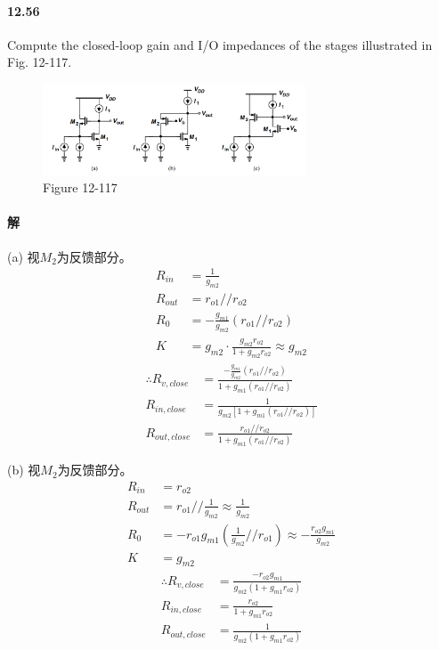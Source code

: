 \documentclass[hyperref, UTF8]{ctexart}
\newcommand{\under}[1]{\frac{1}{#1}}
\begin{document}
\paragraph{12.56} \label{12.56}
    Compute the closed-loop gain and I/O impedances of the stages illustrated in Fig. 12-117.
    \begin{figure}[!htb]
        \centering
        \includegraphics[width=0.695\textwidth]{p12-117.png}
        \caption*{Figure 12-117}
    \end{figure}        
\paragraph{解}
    (a) 视$M_2$为反馈部分。
    \begin{align*}
        R_{in} & = \under{g_{m2}} \\
        R_{out} & = r_{o1} // r_{o2} \\
        R_0 & = -\frac{g_{m1}}{g_{m2}}(r_{o1}//r_{o2})\\
        K & = g_{m2} \cdot \frac{g_{m2}r_{o2}}{1+g_{m2}r_{o2}} \approx g_{m2}
    \end{align*}
    \begin{align*}
        \therefore R_{v, close} & = \frac{-\frac{g_{m1}}{g_{m2}}(r_{o1}//r_{o2})}{1+g_{m1}(r_{o1}//r_{o2})} \\
        R_{in,close} & = \under{g_{m2}[1+g_{m1}(r_{o1}//r_{o2})]}\\
        R_{out,close} & = \frac{r_{o1}//r_{o2}}{1+g_{m1}(r_{o1}//r_{o2})}
    \end{align*}

    (b) 视$M_2$为反馈部分。
    \begin{align*}
        R_{in} & = r_{o2} \\
        R_{out} & = r_{o1} // \under{g_{m2}} \approx \under{g_{m2}} \\
        R_0 & = -r_{o1}g_{m1}(\under{g_{m2}}//r_{o1}) \approx -\frac{r_{o2}g_{m1}}{g_{m2}}\\
        K & = g_{m2}
    \end{align*}
    \begin{align*}
        \therefore R_{v, close} & = \frac{-r_{o2}g_{m1}}{g_{m2}(1+g_{m1}r_{o2})} \\
        R_{in,close} & = \frac{r_{o2}}{1+g_{m1}r_{o2}}\\
        R_{out,close} & = \under{g_{m2}(1+g_{m1}r_{o2})}
    \end{align*}
\end{document}
